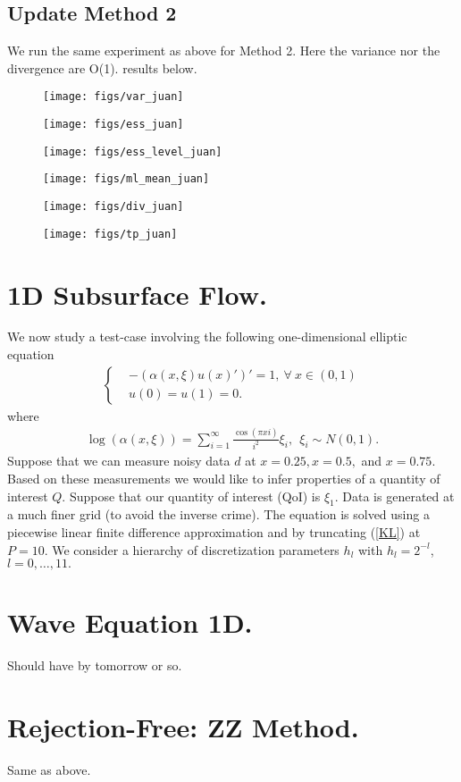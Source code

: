 \documentclass[a4paper]{article}
\begin{document}
\color{red}
\color{red} \subsection{Update Method 2}
We run the same experiment as above for Method 2. Here the variance nor the divergence are O(1). results below.
\begin{figure}[H]
	\centering
	\texttt{[image: figs/var\_juan]}
	\caption{}
	\label{fig:varjuan}
\end{figure}
\begin{figure}[H]
	\centering
	\texttt{[image: figs/ess\_juan]}
	\caption{}
	\label{fig:essjuan}
\end{figure}
\begin{figure}[H]
	\centering
	\texttt{[image: figs/ess\_level\_juan]}
	\caption{}
	\label{fig:essleveljuan}
\end{figure}
\begin{figure}[H]
	\centering
	\texttt{[image: figs/ml\_mean\_juan]}
	\caption{}
	\label{fig:mlmeanjuan}
\end{figure}
\begin{figure}[H]
	\centering
	\texttt{[image: figs/div\_juan]}
	\caption{}
	\label{fig:divjuan}
\end{figure}
\begin{figure}[H]
	\centering
	\texttt{[image: figs/tp\_juan]}
	\caption{}
	\label{fig:tpjuan}
\end{figure}


\color{black} 
\section{1D Subsurface Flow.}
We now study a test-case involving the following  one-dimensional elliptic equation \begin{align}
\begin{cases}
&-(\alpha(x,\xi)u(x)')'=1, \ \forall \ x\in(0,1)\\
&u(0)=u(1)=0.
\end{cases}
\end{align}
where \begin{align}\label{KL}
\log(\alpha(x,\xi))=\sum^\infty_{i=1}\frac{\cos(\pi x i)}{i^2}\xi_i, \ \ \xi_i\sim N(0,1).
\end{align}
Suppose that we can measure noisy data $d$ at $x=0.25,x=0.5,$ and $x=0.75$. Based on these measurements we would like to infer properties of a quantity of interest $Q$. Suppose that our quantity of interest (QoI) is $\xi_1$. Data is generated at a much finer grid (to avoid the inverse crime). The equation is solved using a piecewise linear finite difference approximation and by truncating (\ref{KL}) at $P=10$. We consider a hierarchy of discretization parameters $h_l$ with $h_l=2^{-l}$, $l=0,\dots,11.$
\section{Wave Equation 1D.}
Should have by tomorrow or so.
\section{Rejection-Free: ZZ Method.}
Same as above.
 
 
 \newpage
 




 	
 	
\end{document}
